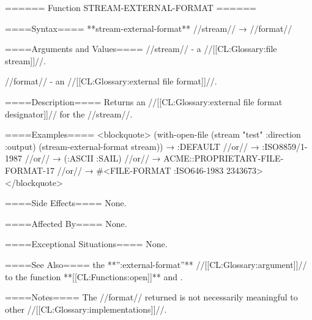 ====== Function STREAM-EXTERNAL-FORMAT ======

====Syntax====
**stream-external-format** //stream// → //format//

====Arguments and Values====
//stream// - a //[[CL:Glossary:file stream]]//.

//format// - an //[[CL:Glossary:external file format]]//.

====Description====
Returns an //[[CL:Glossary:external file format designator]]// for the //stream//.

====Examples====
<blockquote> (with-open-file (stream "test" :direction :output) (stream-external-format stream)) → :DEFAULT //or// → :ISO8859/1-1987 //or// → (:ASCII :SAIL) //or// → ACME::PROPRIETARY-FILE-FORMAT-17 //or// → #<FILE-FORMAT :ISO646-1983 2343673> </blockquote>

====Side Effects====
None.

====Affected By====
None.

====Exceptional Situations====
None.

====See Also====
the **'':external-format''** //[[CL:Glossary:argument]]// to the function **[[CL:Functions:open]]** and .

====Notes====
The //format// returned is not necessarily meaningful to other //[[CL:Glossary:implementations]]//.

